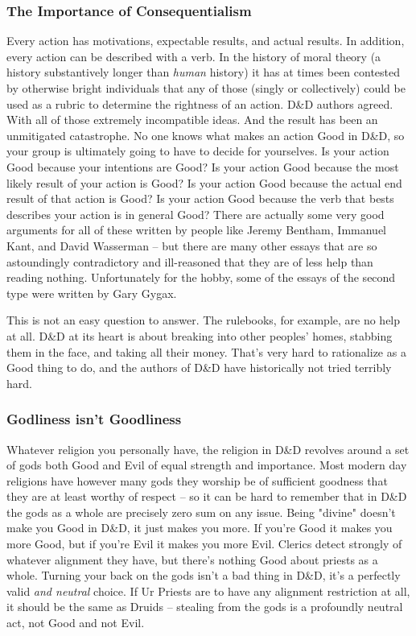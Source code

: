 \subsubsection{The Importance of Consequentialism}
Every action has motivations, expectable results, and actual results. In addition, every action can be described with a verb. In the history of moral theory (a history substantively longer than \textit{human} history) it has at times been contested by otherwise bright individuals that any of those (singly or collectively) could be used as a rubric to determine the rightness of an action. D\&D authors agreed. With all of those extremely incompatible ideas. And the result has been an unmitigated catastrophe. No one knows what makes an action Good in D\&D, so your group is ultimately going to have to decide for yourselves. Is your action Good because your intentions are Good? Is your action Good because the most likely result of your action is Good? Is your action Good because the actual end result of that action is Good? Is your action Good because the verb that bests describes your action is in general Good? There are actually some very good arguments for all of these written by people like Jeremy Bentham, Immanuel Kant, and David Wasserman -- but there are many other essays that are so astoundingly contradictory and ill-reasoned that they are of less help than reading nothing. Unfortunately for the hobby, some of the essays of the second type were written by Gary Gygax.

This is not an easy question to answer. The rulebooks, for example, are no help at all. D\&D at its heart is about breaking into other peoples' homes, stabbing them in the face, and taking all their money. That's very hard to rationalize as a Good thing to do, and the authors of D\&D have historically not tried terribly hard.

\subsubsection{Godliness isn't Goodliness}
Whatever religion you personally have, the religion in D\&D revolves around a set of gods both Good and Evil of equal strength and importance. Most modern day religions have however many gods they worship be of sufficient goodness that they are at least worthy of respect -- so it can be hard to remember that in D\&D the gods as a whole are precisely zero sum on any issue. Being "divine" doesn't make you Good in D\&D, it just makes you more. If you're Good it makes you more Good, but if you're Evil it makes you more Evil. Clerics detect strongly of whatever alignment they have, but there's nothing Good about priests as a whole. Turning your back on the gods isn't a bad thing in D\&D, it's a perfectly valid \textit{and neutral} choice. If Ur Priests are to have any alignment restriction at all, it should be the same as Druids -- stealing from the gods is a profoundly neutral act, not Good and not Evil.

